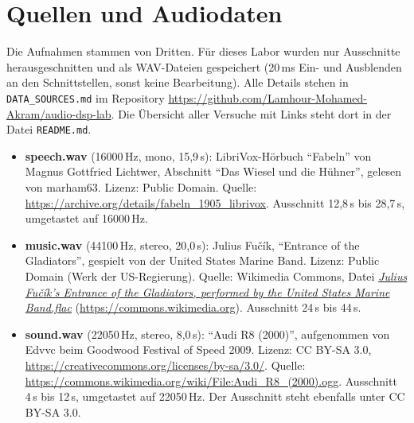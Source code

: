 \documentclass[11pt]{article}
\begin{document}
\section{Quellen und Audiodaten}

Die Aufnahmen stammen von Dritten. Für dieses Labor wurden nur Ausschnitte herausgeschnitten und als WAV-Dateien gespeichert (20\,ms Ein- und Ausblenden an den Schnittstellen, sonst keine Bearbeitung). Alle Details stehen in \texttt{DATA\_SOURCES.md} im Repository \url{https://github.com/Lamhour-Mohamed-Akram/audio-dsp-lab}. Die Übersicht aller Versuche mit Links steht dort in der Datei \texttt{README.md}.

{\small
\begin{itemize}
  \item \textbf{speech.wav} (16000\,Hz, mono, 15,9\,s): LibriVox-Hörbuch "`Fabeln"' von Magnus Gottfried Lichtwer, Abschnitt "`Das Wiesel und die Hühner"', gelesen von marham63. Lizenz: Public Domain. Quelle: \url{https://archive.org/details/fabeln_1905_librivox}. Ausschnitt 12,8\,s bis 28,7\,s, umgetastet auf 16000\,Hz.
  \item \textbf{music.wav} (44100\,Hz, stereo, 20,0\,s): Julius Fučík, "`Entrance of the Gladiators"', gespielt von der United States Marine Band. Lizenz: Public Domain (Werk der US-Regierung). Quelle: Wikimedia Commons, Datei \href{https://commons.wikimedia.org/wiki/File:Julius_Fu%C4%8D%C3%ADk%27s_%22Entrance_of_the_Gladiators%22,_performed_by_the_United_States_Marine_Band.flac}{\textit{Julius Fučík's Entrance of the Gladiators, performed by the United States Marine Band.flac}} (\url{https://commons.wikimedia.org}). Ausschnitt 24\,s bis 44\,s.
  \item \textbf{sound.wav} (22050\,Hz, stereo, 8,0\,s): "`Audi R8 (2000)"', aufgenommen von Edvvc beim Goodwood Festival of Speed 2009. Lizenz: CC BY-SA 3.0, \url{https://creativecommons.org/licenses/by-sa/3.0/}. Quelle: \url{https://commons.wikimedia.org/wiki/File:Audi_R8_(2000).ogg}. Ausschnitt 4\,s bis 12\,s, umgetastet auf 22050\,Hz. Der Ausschnitt steht ebenfalls unter CC BY-SA 3.0.
\end{itemize}}
\end{document}
